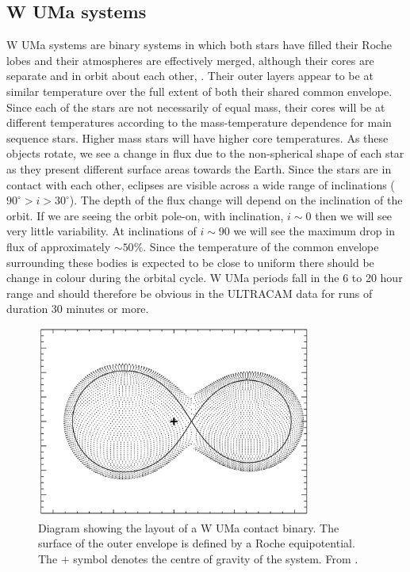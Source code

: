 \subsection{{W UMa} systems}
{W UMa} systems are binary systems in which both stars have filled their Roche lobes and their atmospheres are effectively merged, although their cores are separate and in orbit about each other, \citep{Lucy68}. Their outer layers appear to be at similar temperature over the full extent of both their shared common envelope. Since each of the stars are not necessarily of equal mass, their cores will be at different temperatures according to the mass-temperature dependence for main sequence stars. Higher mass stars will have higher core temperatures.  As these objects rotate, we see a change in flux due to the non-spherical shape of each star as they present different surface areas towards the Earth. Since the stars are in contact with each other, eclipses are visible across a wide range of inclinations ($90^\circ > i > 30^\circ$). The depth of the flux change will depend on the inclination of the orbit. If we are seeing the orbit pole-on, with inclination, $i \sim 0$ then we will see very little variability. At inclinations of $i \sim 90$ we will see the maximum drop in flux of approximately $\sim50\%$. Since the temperature of the common envelope surrounding these bodies is expected to be close to uniform there should be change in colour during the orbital cycle. W UMa periods fall in the 6 to 20 hour range and should therefore be obvious in the ULTRACAM data for runs of duration 30 minutes or more. 

\begin{figure}
\centering
\includegraphics[width=90mm]{images/wuma_diagram.png}
\caption{Diagram showing the layout of a {W UMa} contact binary. The surface of the outer envelope is defined by a Roche equipotential. The $+$ symbol denotes the centre of gravity of the system.  From \citet{0004-637X-764-1-62}. }
\label{fig:wumadiagram}
\end{figure}

